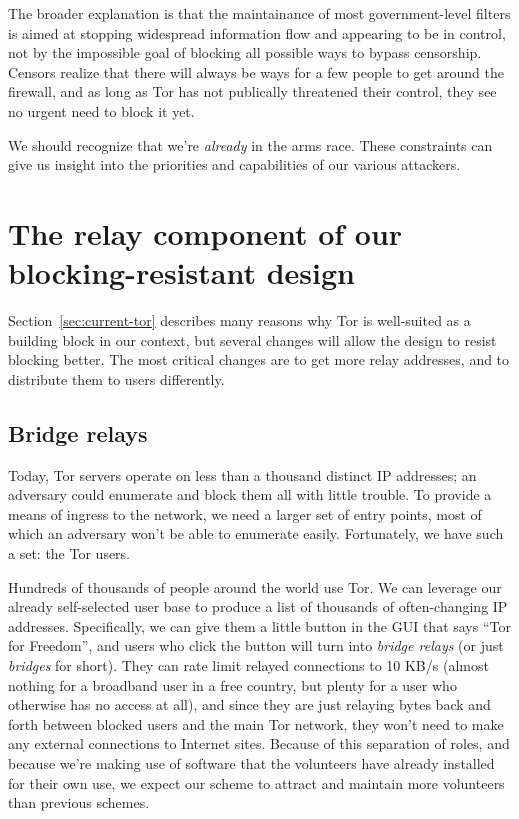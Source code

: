 \documentclass{llncs}
\begin{document}
The broader explanation is that the maintainance of most government-level
filters is aimed at stopping widespread information flow and appearing to be
in control, not by the impossible goal of blocking all possible ways to bypass
censorship. Censors realize that there will always
be ways for a few people to get around the firewall, and as long as Tor
has not publically threatened their control, they see no urgent need to
block it yet.

We should recognize that we're \emph{already} in the arms race. These
constraints can give us insight into the priorities and capabilities of
our various attackers.

\section{The relay component of our blocking-resistant design}
\label{sec:bridges}

Section~\ref{sec:current-tor} describes many reasons why Tor is
well-suited as a building block in our context, but several changes will
allow the design to resist blocking better. The most critical changes are
to get more relay addresses, and to distribute them to users differently.



\subsection{Bridge relays}

Today, Tor servers operate on less than a thousand distinct IP addresses;
an adversary
could enumerate and block them all with little trouble.  To provide a
means of ingress to the network, we need a larger set of entry points, most
of which an adversary won't be able to enumerate easily.  Fortunately, we
have such a set: the Tor users.

Hundreds of thousands of people around the world use Tor. We can leverage
our already self-selected user base to produce a list of thousands of
often-changing IP addresses. Specifically, we can give them a little
button in the GUI that says ``Tor for Freedom'', and users who click
the button will turn into \emph{bridge relays} (or just \emph{bridges}
for short). They can rate limit relayed connections to 10 KB/s (almost
nothing for a broadband user in a free country, but plenty for a user
who otherwise has no access at all), and since they are just relaying
bytes back and forth between blocked users and the main Tor network, they
won't need to make any external connections to Internet sites. Because
of this separation of roles, and because we're making use of software
that the volunteers have already installed for their own use, we expect
our scheme to attract and maintain more volunteers than previous schemes.
\end{document}
